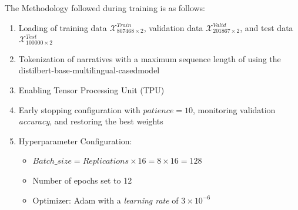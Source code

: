 \documentclass[onecolumn, journal, english, 12pt, a4paper]{IEEEtran} %
\newcommand{\modelohuggingface}{distilbert-base-multilingual-cased}
\theoremstyle{definition}
\begin{document}




The Methodology followed during training is as follows:

\begin{enumerate}
  
\item Loading of training data
  $\mathbf{\mathcal{X}}^{Train}_{807468\times 2}$, validation data
  $\mathbf{\mathcal{X}}^{Valid}_{201867\times 2}$, and test data
  $\mathbf{\mathcal{X}}^{Test}_{100000 \times 2}$
\item Tokenization of narratives with a maximum sequence length of
   using the \modelohuggingface model
\item Enabling Tensor Processing Unit (TPU)
\item Early stopping configuration with $patience=10$, monitoring
  validation \emph{accuracy}, and restoring the best weights
\item Hyperparameter Configuration:
            \begin{itemize}
            \item
              $Batch\_size = Replications \times 16 = 8 \times 16 =
              128$
                \item Number of epochs set to 12
                \item Optimizer: Adam with a \emph{learning rate} of $3\times 10^{-6}$
            \end{itemize}
    \end{enumerate}
\end{document}
